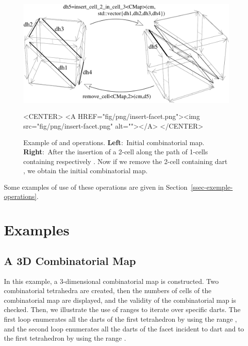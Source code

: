 \begin{figure}[htb]
  \begin{ccTexOnly}
    \begin{center}
      \includegraphics[width=.75\textwidth]{Combinatorial_map/fig/pdf/insert-facet}
    \end{center}
  \end{ccTexOnly}
  \begin{ccHtmlOnly}
    <CENTER> <A HREF="fig/png/insert-facet.png"><img
    src="fig/png/insert-facet.png" alt=""></A> </CENTER>
  \end{ccHtmlOnly}
  \caption{Example of  and
     operations. \textbf{Left}:~Initial
    combinatorial map.  \textbf{Right}:~After the insertion of a
    2-cell along the path of 1-cells containing respectively
    .  Now if we remove the 2-cell containing dart
    , we obtain the initial combinatorial map.}
  \label{fig-insert-face}
\end{figure}

Some examples of use of these operations are given in
Section~\ref{ssec-exemple-operations}.

\section{Examples}

\subsection{A 3D Combinatorial Map}\label{ssec-example-3DCM}
In this example, a 3-dimensional combinatorial map is constructed. Two
combinatorial tetrahedra are created, then the numbers of cells of the
combinatorial map are displayed, and the validity of the combinatorial
map is checked.  Then, we illustrate the use of ranges to iterate over
specific darts.  The first loop enumerates all the darts of the first
tetrahedron by using the range , and the
second loop enumerates all the darts of the facet incident to dart
 and to the first tetrahedron by using the range
.


